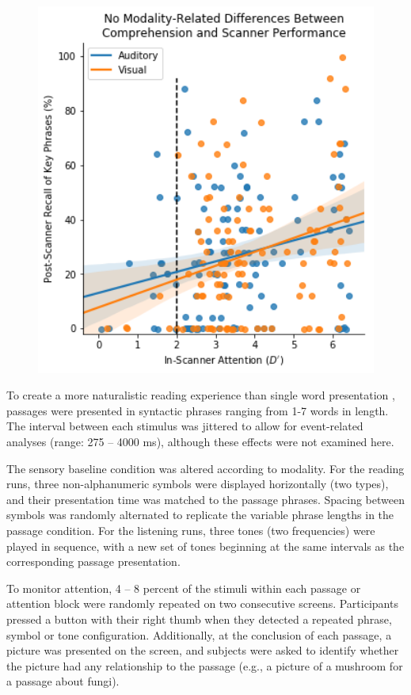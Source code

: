 \begin{figure}[tp]
	\centering
	\includegraphics[width=5in]{images/ch2-eprime-recall.png}
	\caption[Schematic of the reading comprehension task.]
	\label{fig:ch2-task-design}
\end{figure}

To create a more naturalistic reading experience than single word presentation \cite{Rayner1986}, passages were presented in syntactic phrases ranging from 1-7 words in length. The interval between each stimulus was jittered to allow for event-related analyses (range: 275 – 4000 ms), although these effects were not examined here.

The sensory baseline condition was altered according to modality. For the reading runs, three non-alphanumeric symbols were displayed horizontally (two types), and their presentation time was matched to the passage phrases. Spacing between symbols was randomly alternated to replicate the variable phrase lengths in the passage condition. For the listening runs, three tones (two frequencies) were played in sequence, with a new set of tones beginning at the same intervals as the corresponding passage presentation. 

To monitor attention, 4 – 8 percent of the stimuli within each passage or attention block were randomly repeated on two consecutive screens.  Participants pressed a button with their right thumb when they detected a repeated phrase, symbol or tone configuration. Additionally, at the conclusion of each passage, a picture was presented on the screen, and subjects were asked to identify whether the picture had any relationship to the passage (e.g., a picture of a mushroom for a passage about fungi). 

